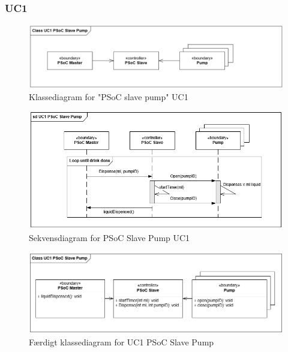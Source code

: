 \subsubsection{UC1}
\begin{figure}[H]
	\centering
	\includegraphics[width=1\textwidth]{Images/Applikationsmodeller/UC1_cd_PSoC_Slave_pump.png}
	\caption{Klassediagram for "PSoC slave pump" UC1}
	\label{fig:cdUC1PSoCSlavePump}
\end{figure}

\begin{figure}[H]
	\centering
	\includegraphics[width=1\textwidth]{Images/Applikationsmodeller/UC1_sd_PSoC_Slave_pump.png}
	\caption{Sekvensdiagram for PSoC Slave Pump UC1}
	\label{fig:sdUC1PSoCSlavePump}
\end{figure}

\begin{figure}[H]
	\centering
	\includegraphics[width=1\textwidth]{Images/Applikationsmodeller/UC1_cd_PSoC_Slave_pump_final.png}
	\caption{Færdigt klassediagram for UC1 PSoC Slave Pump}
	\label{fig:cdUC1PSoCSlavePump_final}
\end{figure}


